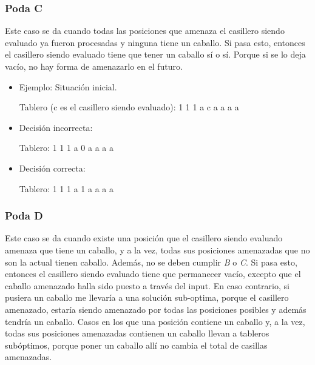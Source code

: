 \subsubsection{Poda C}
Este caso se da cuando todas las posiciones que amenaza el casillero siendo evaluado ya fueron procesadas y ninguna tiene un caballo.
Si pasa esto, entonces el casillero siendo evaluado tiene que tener un caballo sí o sí. Porque si se lo deja vacío, no hay forma de amenazarlo en el futuro.

\begin{itemize}
\item Ejemplo: Situación inicial.

\begin{codesnippet}
Tablero (c es el casillero siendo evaluado):
1 1 1
a c a
a a a
\end{codesnippet}

\item Decisión incorrecta:

\begin{codesnippet}
Tablero:
1 1 1
a 0 a
a a a
\end{codesnippet}

\item Decisión correcta:

\begin{codesnippet}
Tablero:
1 1 1
a 1 a
a a a
\end{codesnippet}
\end{itemize}

\subsubsection{Poda D}
Este caso se da cuando existe una posición que el casillero siendo evaluado amenaza que tiene un caballo, y a la vez, todas sus posiciones amenazadas que no son la actual tienen caballo. Además, no se deben cumplir \textit{B} o \textit{C}.
Si pasa esto, entonces el casillero siendo evaluado tiene que permanecer vacío, excepto que el caballo amenazado halla sido puesto a través del input. En caso contrario, si pusiera un caballo me llevaría a una solución sub-optima, porque el casillero amenazado, estaría siendo amenazado por todas las posiciones posibles y además tendría un caballo. Casos en los que una posición contiene un caballo y, a la vez, todas sus posiciones amenazadas contienen un caballo llevan a tableros subóptimos, porque poner un caballo allí no cambia el total de casillas amenazadas.

